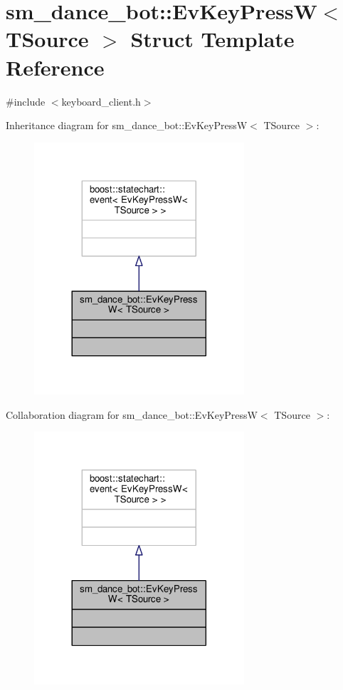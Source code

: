\hypertarget{structsm__dance__bot_1_1EvKeyPressW}{}\section{sm\+\_\+dance\+\_\+bot\+:\+:Ev\+Key\+PressW$<$ T\+Source $>$ Struct Template Reference}
\label{structsm__dance__bot_1_1EvKeyPressW}


{\ttfamily \#include $<$keyboard\+\_\+client.\+h$>$}



Inheritance diagram for sm\+\_\+dance\+\_\+bot\+:\+:Ev\+Key\+PressW$<$ T\+Source $>$\+:
\nopagebreak
\begin{figure}[H]
\begin{center}
\leavevmode
\includegraphics[width=221pt]{structsm__dance__bot_1_1EvKeyPressW__inherit__graph}
\end{center}
\end{figure}


Collaboration diagram for sm\+\_\+dance\+\_\+bot\+:\+:Ev\+Key\+PressW$<$ T\+Source $>$\+:
\nopagebreak
\begin{figure}[H]
\begin{center}
\leavevmode
\includegraphics[width=221pt]{structsm__dance__bot_1_1EvKeyPressW__coll__graph}
\end{center}
\end{figure}


